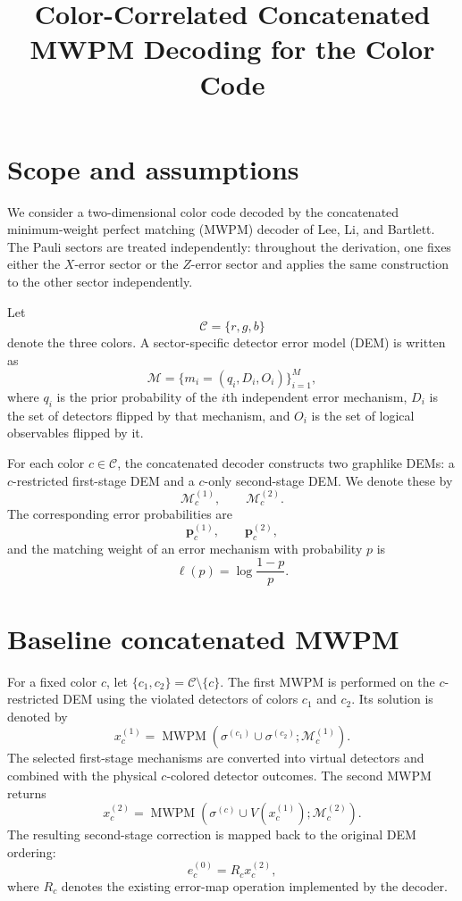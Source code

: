 \documentclass[11pt]{article}
\title{Color-Correlated Concatenated MWPM Decoding for the Color Code}
\author{}
\date{}
\newcommand{\Cset}{\mathcal C}
\newcommand{\M}{\mathcal M}
\begin{document}
\maketitle

\section{Scope and assumptions}

We consider a two-dimensional color code decoded by the concatenated minimum-weight
perfect matching (MWPM) decoder of Lee, Li, and Bartlett.  The Pauli sectors are
treated independently: throughout the derivation, one fixes either the $X$-error
sector or the $Z$-error sector and applies the same construction to the other sector
independently.

Let
\[
    \Cset = \{r,g,b\}
\]
denote the three colors.  A sector-specific detector error model (DEM) is written as
\[
    \M = \{m_i=(q_i,D_i,O_i)\}_{i=1}^{M},
\]
where $q_i$ is the prior probability of the $i$th independent error mechanism,
$D_i$ is the set of detectors flipped by that mechanism, and $O_i$ is the set of
logical observables flipped by it.

For each color $c\in\Cset$, the concatenated decoder constructs two graphlike DEMs:
a $c$-restricted first-stage DEM and a $c$-only second-stage DEM.  We denote these by
\[
    \M_c^{(1)},\qquad \M_c^{(2)}.
\]
The corresponding error probabilities are
\[
    \bm p_c^{(1)},\qquad \bm p_c^{(2)},
\]
and the matching weight of an error mechanism with probability $p$ is
\[
    \ell(p)=\log\frac{1-p}{p}.
\]

\section{Baseline concatenated MWPM}

For a fixed color $c$, let $\{c_1,c_2\}=\Cset\setminus\{c\}$.  The first MWPM is
performed on the $c$-restricted DEM using the violated detectors of colors $c_1$ and
$c_2$.  Its solution is denoted by
\[
    x_c^{(1)}
    =
    \operatorname{MWPM}
    \left(
        \sigma^{(c_1)}\cup\sigma^{(c_2)};
        \M_c^{(1)}
    \right).
\]
The selected first-stage mechanisms are converted into virtual detectors and combined
with the physical $c$-colored detector outcomes.  The second MWPM returns
\[
    x_c^{(2)}
    =
    \operatorname{MWPM}
    \left(
        \sigma^{(c)}\cup V(x_c^{(1)});
        \M_c^{(2)}
    \right).
\]
The resulting second-stage correction is mapped back to the original DEM ordering:
\[
    e_c^{(0)} = R_c x_c^{(2)},
\]
where $R_c$ denotes the existing error-map operation implemented by the decoder.
\end{document}
